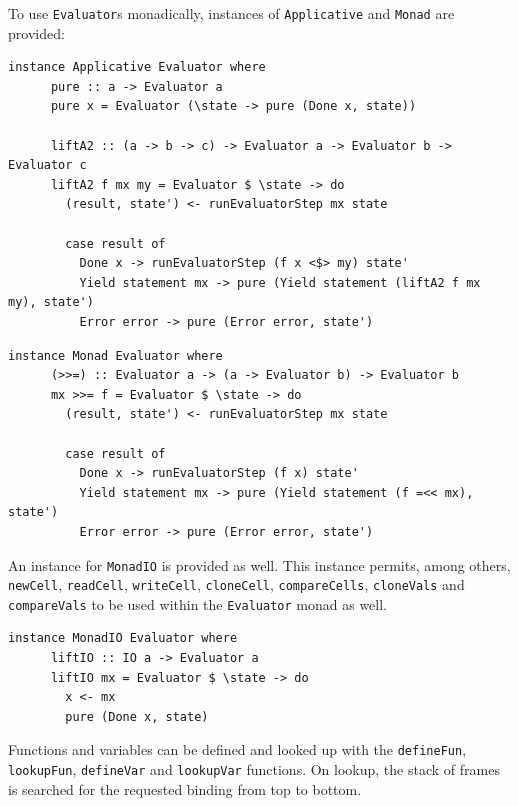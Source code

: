 \documentclass[UdineBachThesis,american,11pt]{PhdThesis}
\begin{document}
  To use \mbox{\texttt{Evaluator}s} monadically, instances of
  \mbox{\texttt{Applicative}} and \mbox{\texttt{Monad}} are provided:

  \begin{Verbatim}[gobble=4,fontsize=\small]
    instance Applicative Evaluator where
      pure :: a -> Evaluator a
      pure x = Evaluator (\state -> pure (Done x, state))

      liftA2 :: (a -> b -> c) -> Evaluator a -> Evaluator b -> Evaluator c
      liftA2 f mx my = Evaluator $ \state -> do
        (result, state') <- runEvaluatorStep mx state

        case result of
          Done x -> runEvaluatorStep (f x <$> my) state'
          Yield statement mx -> pure (Yield statement (liftA2 f mx my), state')
          Error error -> pure (Error error, state')
  \end{Verbatim}

  \pagebreak

  \begin{Verbatim}[gobble=4,fontsize=\small]
    instance Monad Evaluator where
      (>>=) :: Evaluator a -> (a -> Evaluator b) -> Evaluator b
      mx >>= f = Evaluator $ \state -> do
        (result, state') <- runEvaluatorStep mx state

        case result of
          Done x -> runEvaluatorStep (f x) state'
          Yield statement mx -> pure (Yield statement (f =<< mx), state')
          Error error -> pure (Error error, state')
  \end{Verbatim}

  An instance for \mbox{\texttt{MonadIO}} is provided as well. This instance
  permits, among others, \mbox{\texttt{newCell}}, \mbox{\texttt{readCell}},
  \mbox{\texttt{writeCell}}, \mbox{\texttt{cloneCell}},
  \mbox{\texttt{compareCells}}, \mbox{\texttt{cloneVals}} and
  \mbox{\texttt{compareVals}} to be used within the \mbox{\texttt{Evaluator}}
  monad as well.

  \begin{Verbatim}[gobble=4,fontsize=\small]
    instance MonadIO Evaluator where
      liftIO :: IO a -> Evaluator a
      liftIO mx = Evaluator $ \state -> do
        x <- mx
        pure (Done x, state)
  \end{Verbatim}

  Functions and variables can be defined and looked up with the
  \mbox{\texttt{defineFun}}, \mbox{\texttt{lookupFun}},
  \mbox{\texttt{defineVar}} and \mbox{\texttt{lookupVar}} functions. On lookup,
  the stack of frames is searched for the requested binding from top to bottom.
\end{document}
